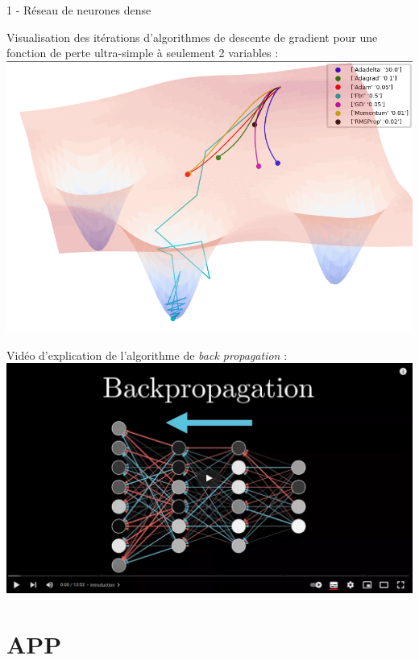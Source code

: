 \documentclass[10pt,serif,mathserif,compress,hyperref={colorlinks}]{beamer}
\begin{document}
\begin{frame}{1 - Réseau de neurones dense}

  {\small Visualisation des itérations d'algorithmes de descente de gradient pour une fonction de perte ultra-simple à seulement 2 variables :}\\[2mm]
  \hspace*{25mm}\href{https://github.com/Jaewan-Yun/optimizer-visualization/blob/master/figures/movie9.gif}{\includegraphics[width=.45\textwidth]{images/adam_plot3D_animated.png}}\\[-2mm]

  \medskip
  {\small Vidéo d'explication de l'algorithme de {\em back propagation} :}\\
  \hspace*{30mm}\href{https://www.3blue1brown.com/lessons/backpropagation}{\includegraphics[width=.35\textwidth]{images/video-BackPropagation.png}}
\end{frame}

\section{APP}
\end{document}
